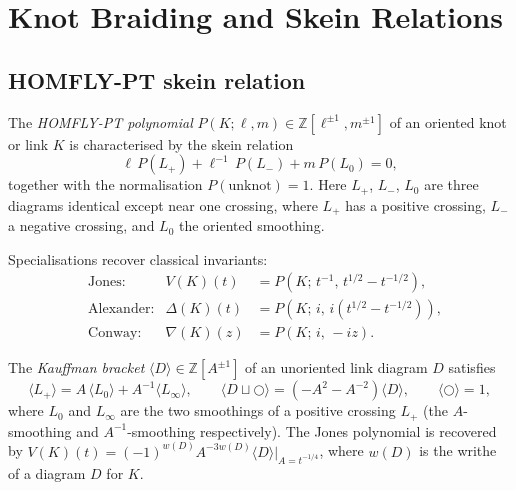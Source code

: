 
\section{Knot Braiding and Skein Relations}
\label{sec:knot-braiding}

\subsection{HOMFLY-PT skein relation}
\label{subsec:homfly-skein}

\begin{definition}
\label{def:homfly}
The \emph{HOMFLY-PT polynomial} $P(K; \ell, m) \in \mathbb{Z}[\ell^{\pm 1}, m^{\pm 1}]$
of an oriented knot or link $K$ is characterised by the skein relation
\begin{equation}\label{eq:homfly-skein}
  \ell\,P(L_+) + \ell^{-1}\,P(L_-) + m\,P(L_0) = 0,
\end{equation}
together with the normalisation $P(\text{unknot}) = 1$.  Here
$L_+$, $L_-$, $L_0$ are three diagrams identical except near one
crossing, where $L_+$ has a positive crossing, $L_-$ a negative
crossing, and $L_0$ the oriented smoothing.

\medskip\noindent
Specialisations recover classical invariants:
\begin{align}
  &\text{Jones:} &
    V(K)(t) &= P(K;\, t^{-1},\, t^{1/2}-t^{-1/2}),
    \label{eq:jones-specialisation}\\[4pt]
  &\text{Alexander:} &
    \Delta(K)(t) &= P(K;\, i,\, i(t^{1/2}-t^{-1/2})),
    \label{eq:alexander-specialisation}\\[4pt]
  &\text{Conway:} &
    \nabla(K)(z) &= P(K;\, i,\, -iz).
    \label{eq:conway-specialisation}
\end{align}
\end{definition}

\begin{definition}
\label{def:kauffman-bracket}
The \emph{Kauffman bracket} $\langle D \rangle \in \mathbb{Z}[A^{\pm 1}]$ of
an unoriented link diagram $D$ satisfies
\begin{equation}\label{eq:kauffman-bracket}
  \langle L_+ \rangle
  = A\,\langle L_{0} \rangle
  + A^{-1}\langle L_{\infty} \rangle,
  \qquad
  \langle D \sqcup \bigcirc \rangle = (-A^2 - A^{-2})\langle D \rangle,
  \qquad
  \langle \bigcirc \rangle = 1,
\end{equation}
where $L_0$ and $L_\infty$ are the two smoothings of a positive crossing $L_+$
(the $A$-smoothing and $A^{-1}$-smoothing respectively).
The Jones polynomial is recovered by
$V(K)(t) = (-1)^{w(D)}A^{-3w(D)}\langle D\rangle\big|_{A=t^{-1/4}}$,
where $w(D)$ is the writhe of a diagram $D$ for $K$.
\end{definition}

